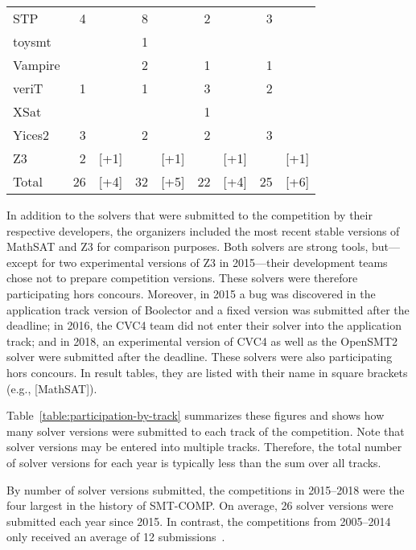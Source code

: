 \documentclass[twoside,11pt]{article}
\begin{document}
\begin{table}
\begin{tabular}{|l|r@{\,\,}r|r@{\,\,}r|r@{\,\,}r|r@{\,\,}r|}
    STP               &  4 &      &  8 &      &  2 &      &  3 &      \\
    toysmt            &    &      &  1 &      &    &      &    &      \\
    Vampire           &    &      &  2 &      &  1 &      &  1 &      \\
    veriT             &  1 &      &  1 &      &  3 &      &  2 &      \\
    XSat              &    &      &    &      &  1 &      &    &      \\
    Yices2            &  3 &      &  2 &      &  2 &      &  3 &      \\
    Z3                &  2 & [+1] &    & [+1] &    & [+1] &    & [+1] \\
    \hline
    Total             & 26 & [+4] & 32 & [+5] & 22 & [+4] & 25 & [+6] \\
    \hline
  \end{tabular}
\end{table}

In addition to the solvers that were submitted to the competition by
their respective developers, the organizers included the most recent
stable versions of MathSAT and Z3 for comparison purposes.  Both
solvers are strong tools, but---except for two experimental versions
of Z3 in 2015---their development teams chose not to prepare
competition versions.  These solvers were therefore participating hors
concours.  Moreover, in 2015 a bug was discovered in the application
track version of Boolector and a fixed version was submitted after the
deadline; in 2016, the CVC4 team did not enter their solver into the
application track; and in 2018, an experimental version of CVC4 as
well as the OpenSMT2 solver were submitted after the deadline.  These
solvers were also participating hors concours.  In result tables, they
are listed with their name in square brackets (e.g., [MathSAT]).

Table~\ref{table:participation-by-track} summarizes these figures and
shows how many solver versions were submitted to each track of the
competition.  Note that solver versions may be entered into multiple
tracks.  Therefore, the total number of solver versions for each year
is typically less than the sum over all tracks.

By number of solver versions submitted, the competitions in 2015--2018
were the four largest in the history of SMT-COMP.  On average, 26
solver versions were submitted each year since 2015.  In contrast, the
competitions from 2005--2014 only received an average of 12
submissions~\cite{smtcomp-2014}.
\end{document}
